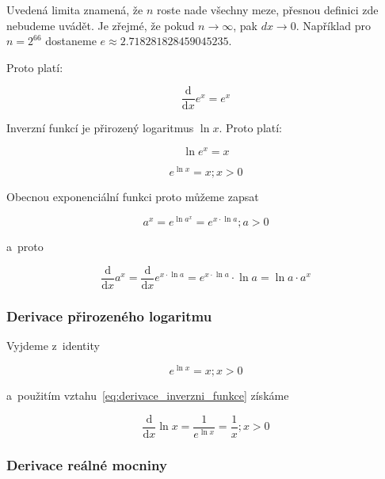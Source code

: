 Uvedená limita znamená, že \(n\) roste nade všechny meze, přesnou definici zde nebudeme uvádět. Je zřejmé, že pokud \(n \to \infty\), pak \(dx \to 0\). Například pro \(n = 2^{66}\) dostaneme \(e \approx 2.718281828459045235\).

Proto platí:

\begin{equation}
\frac{\mathrm{d}}{\mathrm{d}x} e^x = e^x
\end{equation}

Inverzní funkcí je přirozený logaritmus \(\ln x\). Proto platí:

\begin{equation}
\ln e^x = x
\end{equation}

\begin{equation}
e^{\ln x} = x; x > 0
\end{equation}

Obecnou exponenciální funkci proto můžeme zapsat

\begin{equation}
a^x = e^{\ln a^x} = e^{x \cdot \ln a}; a > 0
\end{equation}

a~proto

\begin{equation}
\frac{\mathrm{d}}{\mathrm{d}x} a^x = \frac{\mathrm{d}}{\mathrm{d}x} e^{x \cdot \ln a} = e^{x \cdot \ln a} \cdot \ln a = \ln a \cdot a^x
\end{equation}

\subsubsection{Derivace přirozeného logaritmu}

Vyjdeme z~identity

\begin{equation}
e^{\ln x} = x; x > 0
\end{equation}

a~použitím vztahu~\eqref{eq:derivace_inverzni_funkce} získáme

\begin{equation}
\frac{\mathrm{d}}{\mathrm{d}x} \ln x = \frac{1}{e^{\ln x}} = \frac{1}{x}; x > 0
\end{equation}

\subsubsection{Derivace reálné mocniny}

